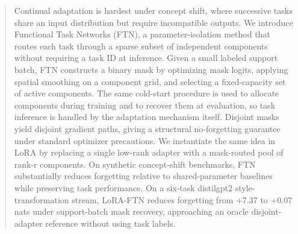 \documentclass{article}
\theoremstyle{plain}
\theoremstyle{remark}
\begin{document}

\printAffiliationsAndNotice{}

\begin{abstract}
Continual adaptation is hardest under concept shift, where successive tasks share an input distribution but require incompatible outputs. We introduce Functional Task Networks (FTN), a parameter-isolation method that routes each task through a sparse subset of independent components without requiring a task ID at inference. Given a small labeled support batch, FTN constructs a binary mask by optimizing mask logits, applying spatial smoothing on a component grid, and selecting a fixed-capacity set of active components. The same cold-start procedure is used to allocate components during training and to recover them at evaluation, so task inference is handled by the adaptation mechanism itself. Disjoint masks yield disjoint gradient paths, giving a structural no-forgetting guarantee under standard optimizer precautions. We instantiate the same idea in LoRA by replacing a single low-rank adapter with a mask-routed pool of rank-r components. On synthetic concept-shift benchmarks, FTN substantially reduces forgetting relative to shared-parameter baselines while preserving task performance. On a six-task distilgpt2 style-transformation stream, LoRA-FTN reduces forgetting from +7.37 to +0.07 nats under support-batch mask recovery, approaching an oracle disjoint-adapter reference without using task labels.
\end{abstract}

\end{document}
